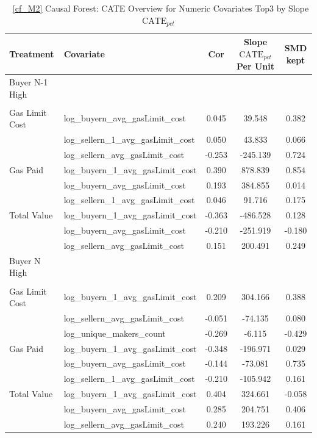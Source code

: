 \begin{table}
\caption{~\ref{cf_M2} Causal Forest: CATE Overview for Numeric Covariates Top3 by Slope $\text{CATE}_{pct}$}
\label{tab:m2\_cate\_n}
\begin{tabular}{llccc}
\toprule
Treatment & Covariate  & Cor  & Slope $\text{CATE}_{pct}$ Per Unit& SMD kept\\
\midrule
Buyer N-1 High &  &  &  & \\
 &  &  &  & \\
Gas Limit Cost & log\_buyern\_avg\_gasLimit\_cost & 0.045 & 39.548 & 0.382\\
 & log\_sellern\_1\_avg\_gasLimit\_cost & 0.050 & 43.833 & 0.066\\
 & log\_sellern\_avg\_gasLimit\_cost & -0.253 & -245.139 & 0.724\\
Gas Paid & log\_buyern\_1\_avg\_gasLimit\_cost & 0.390 & 878.839 & 0.854\\
 & log\_buyern\_avg\_gasLimit\_cost & 0.193 & 384.855 & 0.014\\
 & log\_sellern\_1\_avg\_gasLimit\_cost & 0.046 & 91.716 & 0.175\\
Total Value & log\_buyern\_1\_avg\_gasLimit\_cost & -0.363 & -486.528 & 0.128\\
 & log\_buyern\_avg\_gasLimit\_cost & -0.210 & -251.919 & -0.180\\
 & log\_sellern\_avg\_gasLimit\_cost & 0.151 & 200.491 & 0.249\\
Buyer N High &  &  &  & \\
 &  &  &  & \\
Gas Limit Cost & log\_buyern\_1\_avg\_gasLimit\_cost & 0.209 & 304.166 & 0.388\\
 & log\_sellern\_avg\_gasLimit\_cost & -0.051 & -74.135 & 0.080\\
 & log\_unique\_makers\_count & -0.269 & -6.115 & -0.429\\
Gas Paid & log\_buyern\_1\_avg\_gasLimit\_cost & -0.348 & -196.971 & 0.029\\
 & log\_buyern\_avg\_gasLimit\_cost & -0.144 & -73.081 & 0.735\\
 & log\_sellern\_1\_avg\_gasLimit\_cost & -0.210 & -105.942 & 0.161\\
Total Value & log\_buyern\_1\_avg\_gasLimit\_cost & 0.404 & 324.661 & -0.058\\
 & log\_buyern\_avg\_gasLimit\_cost & 0.285 & 204.751 & 0.406\\
 & log\_sellern\_avg\_gasLimit\_cost & 0.240 & 193.226 & 0.161\\

\end{tabular}
\end{table}
